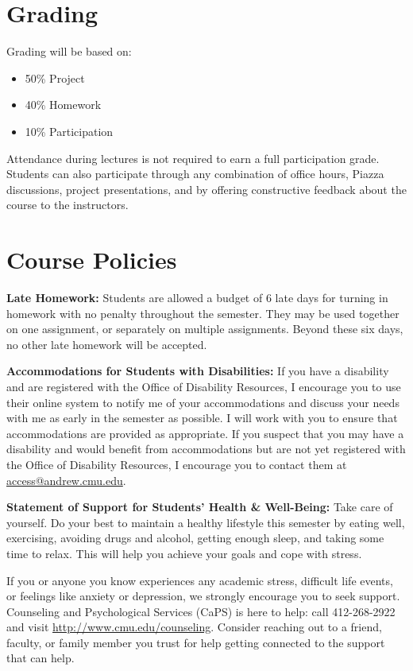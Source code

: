\documentclass[11pt,letterpaper]{article}
\begin{document}
\section*{Grading}

Grading will be based on:
\begin{itemize}
	\item 50\% Project
	\item 40\% Homework
	\item 10\% Participation
\end{itemize}
Attendance during lectures is not required to earn a full participation grade. Students can also participate through any combination of office hours, Piazza discussions, project presentations, and by offering constructive feedback about the course to the instructors.


\section*{Course Policies}

\textbf{Late Homework:} Students are allowed a budget of 6 late days for turning in homework with no penalty throughout the semester. They may be used together on one assignment, or separately on multiple assignments. Beyond these six days, no other late homework will be accepted.

\medskip
\noindent
\textbf{Accommodations for Students with Disabilities:} If you have a disability and are registered with the Office of Disability Resources, I encourage you to use their online system to notify me of your accommodations and discuss your needs with me as early in the semester as possible. I will work with you to ensure that accommodations are provided as appropriate. If you suspect that you may have a disability and would benefit from accommodations but are not yet registered with the Office of Disability Resources, I encourage you to contact them at \href{mailto:access@andrew.cmu.edu}{access@andrew.cmu.edu}.

\medskip
\noindent
\textbf{Statement of Support for Students' Health \& Well-Being:} Take care of yourself. Do your best to maintain a healthy lifestyle this semester by eating well, exercising, avoiding drugs and alcohol, getting enough sleep, and taking some time to relax. This will help you achieve your goals and cope with stress.

\medskip
\noindent
If you or anyone you know experiences any academic stress, difficult life events, or feelings like anxiety or depression, we strongly encourage you to seek support. Counseling and Psychological Services (CaPS) is here to help: call 412-268-2922 and visit \href{http://www.cmu.edu/counseling}{http://www.cmu.edu/counseling}. Consider reaching out to a friend, faculty, or family member you trust for help getting connected to the support that can help.
\end{document}
